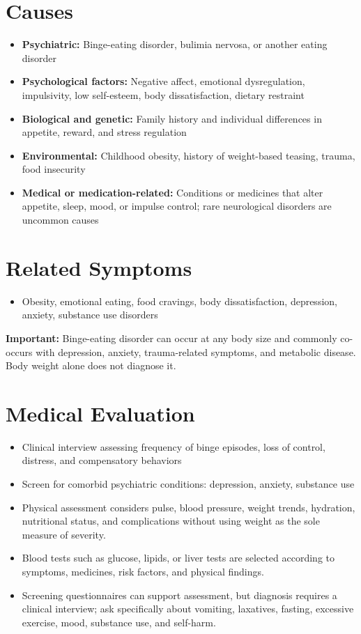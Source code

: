 \section*{Causes}
\begin{itemize}
 \item \textbf{Psychiatric:} Binge-eating disorder, bulimia nervosa, or another eating disorder
 \item \textbf{Psychological factors:} Negative affect, emotional dysregulation, impulsivity, low self-esteem, body dissatisfaction, dietary restraint
 \item \textbf{Biological and genetic:} Family history and individual differences in appetite, reward, and stress regulation
 \item \textbf{Environmental:} Childhood obesity, history of weight-based teasing, trauma, food insecurity
 \item \textbf{Medical or medication-related:} Conditions or medicines that alter appetite, sleep, mood, or impulse control; rare neurological disorders are uncommon causes
\end{itemize}

\section*{Related Symptoms}
\begin{itemize}
 \item Obesity, emotional eating, food cravings, body dissatisfaction, depression, anxiety, substance use disorders
\end{itemize}
\textbf{Important:} Binge-eating disorder can occur at any body size and commonly co-occurs with depression, anxiety, trauma-related symptoms, and metabolic disease. Body weight alone does not diagnose it.

\section*{Medical Evaluation}
\begin{itemize}
 \item Clinical interview assessing frequency of binge episodes, loss of control, distress, and compensatory behaviors
 \item Screen for comorbid psychiatric conditions: depression, anxiety, substance use
 \item Physical assessment considers pulse, blood pressure, weight trends, hydration, nutritional status, and complications without using weight as the sole measure of severity.
 \item Blood tests such as glucose, lipids, or liver tests are selected according to symptoms, medicines, risk factors, and physical findings.
 \item Screening questionnaires can support assessment, but diagnosis requires a clinical interview; ask specifically about vomiting, laxatives, fasting, excessive exercise, mood, substance use, and self-harm.
\end{itemize}

